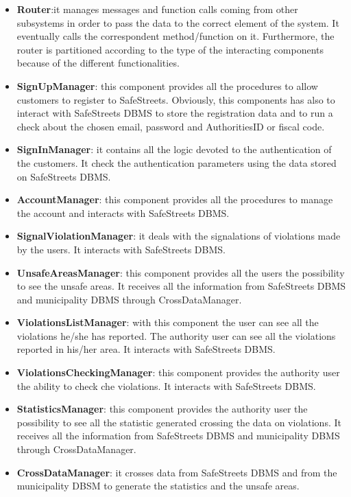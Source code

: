    \begin{itemize}
        \item \textbf{Router}:it manages messages and function calls coming from
        other subsystems in order to pass the data to the correct element of the
        system. It eventually calls the correspondent method/function on it.
        Furthermore, the router is partitioned according to the type of the
        interacting components because of the different functionalities. 
        \item \textbf{SignUpManager}: this component provides all the procedures
        to allow customers to register to SafeStreets. Obviously, this
        components has also to interact with SafeStreets DBMS to store the
        registration data and to run a check about the chosen email, password
        and AuthoritiesID or fiscal code.
        \item \textbf{SignInManager}: it contains all the logic devoted to the
        authentication of the customers. It check the authentication parameters
        using the data stored on SafeStreets DBMS.
        \item \textbf{AccountManager}: this component provides all the
        procedures to manage the account and interacts with SafeStreets
        DBMS.
        \item \textbf{SignalViolationManager}: it deals with the signalations of
        violations made by the users. It interacts with SafeStreets DBMS.
        \item \textbf{UnsafeAreasManager}: this component provides all the users
        the possibility to see the unsafe areas. It receives all the information
        from SafeStreets DBMS and municipality DBMS through CrossDataManager. 
        \item \textbf{ViolationsListManager}: with this component the user can
        see all the violations he/she has reported. The authority user can see
        all the violations reported in his/her area. It interacts with SafeStreets DBMS.
        \item \textbf{ViolationsCheckingManager}: this component provides the
        authority user the ability to check che violations. It interacts with SafeStreets DBMS.
        \item \textbf{StatisticsManager}: this component provides the authority
        user the possibility to see all the statistic generated crossing the
        data on violations. It receives all the information
        from SafeStreets DBMS and municipality DBMS through CrossDataManager. 
        \item \textbf{CrossDataManager}: it crosses data from SafeStreets
        DBMS and from the municipality DBSM to generate the statistics
        and the unsafe areas.
    \end{itemize}    
    \newpage

